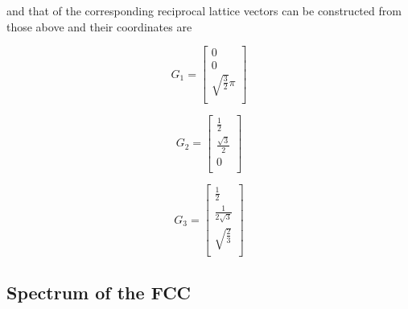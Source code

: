 \documentclass[a4paper]{article}
\begin{document}
and that of the corresponding reciprocal lattice vectors can be constructed from those above and their coordinates are \\
\begin{minipage}{0.3\textwidth}
    \centering
    \begin{equation*}
    G_1 =
    \begin{bmatrix}
        0 \\
        0 \\
        \sqrt{\frac{3}{2}}\pi \\
        
    \end{bmatrix}
    \end{equation*}
    
    \end{minipage}
    \begin{minipage}{0.3\textwidth}
    \centering
    \begin{equation*}
    G_2 =
    \begin{bmatrix}
        \frac{1}{2} \\
        \frac{\sqrt{3}}{2}  \\
        0 \\
    \end{bmatrix}
    \end{equation*}
    \end{minipage}
    \begin{minipage}{0.3\textwidth}
    \centering
    \begin{equation*}
    G_3 =
    \begin{bmatrix}
        \frac{1}{2} \\
        \frac{1}{2\sqrt{3}}  \\
        \sqrt{\frac{2}{3}} \\
    \end{bmatrix}
    \end{equation*}
    \end{minipage}
    \subsection{Spectrum of the FCC}
\end{document}
